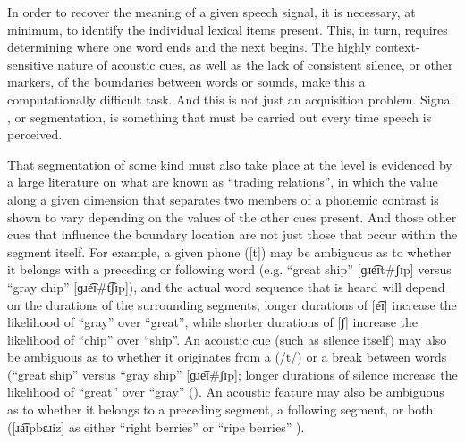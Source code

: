 In order to recover the meaning of a given speech signal, it is necessary,
at minimum, to identify the individual lexical items present. This,
in turn, requires determining where one word ends and the next begins.
The highly context-sensitive nature of acoustic cues, as well as the
lack of consistent silence, or other markers, of the boundaries between
words or sounds, make this a computationally difficult task. And this
is not just an acquisition problem. Signal , or segmentation,
is something that must be carried out every time speech is perceived. 

That segmentation of some kind must also take place at the 
level is evidenced by a large literature on what are known as “trading
relations”, in which the value along a given  dimension
that separates two members of a phonemic contrast is shown to vary
depending on the values of the other  cues present. And those
other cues that influence the boundary location are not just those
that occur within the segment itself. For example, a given phone ({[t]})
may be ambiguous as to whether it belongs with a preceding or following
word (e.g. “great ship” {[}{ɡɹe͡ɪt}\#{ʃɪp}{]}
versus “gray chip” {[}{ɡɹe͡ɪ}\#{t͡ʃɪp}{]}),
and the actual word sequence that is heard will depend on the durations
of the surrounding segments; longer durations of {[e͡ɪ]}
increase the likelihood of “gray” over “great”, while
shorter durations of {[ʃ]} increase the likelihood of “chip”
over “ship”. An acoustic cue (such as silence itself) may also
be ambiguous as to whether it originates from a  ({/t/})
or a break between words (“great ship” versus “gray ship”
{[}{ɡɹe͡ɪ}\#{ʃɪp}{]}; longer durations of silence
increase the likelihood of “great” over “gray” (\citealt{repp1978perceptual}).
An acoustic feature may also be ambiguous as to whether it belongs
to a preceding segment, a following segment, or both ({[}{ɹa͡ɪpbɛɹiz}{]}
as either “right berries” or “ripe berries” \citealt{Gow2003}). 

